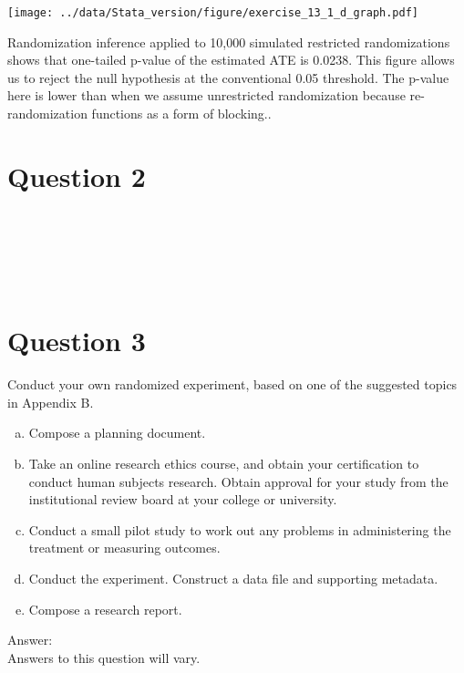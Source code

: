 \documentclass[11pt,notitlepage]{article}\usepackage[]{graphicx}\usepackage[]{color}
\makeatletter
\newenvironment{kframe}{%
 \def\at@end@of@kframe{}%
 \ifinner\ifhmode%
  \def\at@end@of@kframe{\end{minipage}}%
  \begin{minipage}{\columnwidth}%
 \fi\fi%
 \def\FrameCommand##1{\hskip\@totalleftmargin \hskip-\fboxsep
 \colorbox{shadecolor}{##1}\hskip-\fboxsep
     \hskip-\linewidth \hskip-\@totalleftmargin \hskip\columnwidth}%
 \MakeFramed {\advance\hsize-\width
   \@totalleftmargin\z@ \linewidth\hsize
   \@setminipage}}%
 {\par\unskip\endMakeFramed%
 \at@end@of@kframe}
\newenvironment{knitrout}{}{} %
\makeatother
\begin{document}
\begin{enumerate}[a)]
\begin{knitrout}
\begin{kframe}
\begin{Verbatim}[commandchars=\\\{\}]
    \end{Verbatim}
\end{kframe}

{\centering \texttt{[image: ../data/Stata\_version/figure/exercise\_13\_1\_d\_graph.pdf]} 

}



\end{knitrout}

Randomization inference applied to 10,000 simulated restricted randomizations shows that one-tailed p-value of the estimated ATE is 0.0238. This figure allows us to reject the null hypothesis at the conventional 0.05 threshold.  The p-value here is lower than when we assume unrestricted randomization because re-randomization functions as a form of blocking..
\end{enumerate}

\section*{Question 2}
\begin{knitrout}
\color{fgcolor}\begin{kframe}
\begin{verbatim}






\end{verbatim}
\end{kframe}
\end{knitrout}



\section*{Question 3}
Conduct your own randomized experiment, based on one of the suggested topics in Appendix B.
\begin{enumerate}[a)]
\item Compose a planning document.
\item Take an online research ethics course, and obtain your certification to conduct human subjects research. Obtain approval for your study from the institutional review board at your college or university.
\item Conduct a small pilot study to work out any problems in administering the treatment or measuring outcomes.
\item Conduct the experiment. Construct a data file and supporting metadata.
\item Compose a research report.
\end{enumerate}
Answer:\\
Answers to this question will vary.
\end{document}
